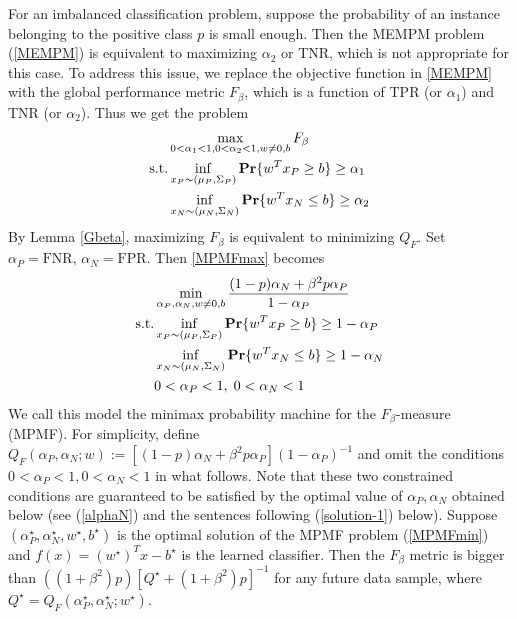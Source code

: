 \documentclass[15pt]{article}
\begin{document}
For an imbalanced classification problem, suppose the probability of an instance belonging to
the positive class $p$ is small enough. Then the MEMPM problem (\ref{MEMPM}) is equivalent to
maximizing $\alpha_2$ or TNR, which is not appropriate for this case.
To address this issue, we replace the objective function in \eqref{MEMPM} with the global performance
metric $F_\beta$, which is a function of TPR (or $\alpha_1$) and TNR (or $\alpha_2$). 
Thus we get the problem
\begin{align}\label{MPMFmax}
\begin{split}
&\max_{0<\alpha_1<1,0<\alpha_2<1, w\neq 0,b}F_\beta\\
\text{s.t.} &\inf_{x_P\sim(\mu_P,\Sigma_P)}{\rm\bf Pr}\{w^Tx_P\ge b\}\ge\alpha_1 \\
&\inf_{x_N\sim(\mu_N,\Sigma_N)}{\rm\bf Pr}\{w^T x_N\le b\}\ge\alpha_2
\end{split}
\end{align}
By Lemma \ref{Gbeta}, maximizing $F_\beta$ is equivalent to minimizing $Q_F$.
Set $\alpha_P=\mbox{FNR}$, $\alpha_N=\mbox{FPR}$. Then \eqref{MPMFmax} becomes
\begin{align}\label{MPMFmin}
\begin{split}
&\min_{\alpha_P,\alpha_N,w\neq 0, b}\frac{(1-p)\alpha_N+\beta^2p\alpha_P}{1-\alpha_P}\\
\text{s.t.} &\inf_{x_P\sim(\mu_P,\Sigma_P)}{\rm\bf Pr}\{w^T x_P\ge b\}\ge 1-\alpha_P \\
&\inf_{x_N\sim(\mu_N,\Sigma_N)}{\rm\bf Pr}\{w^T x_N\le b\}\ge 1-\alpha_N \\
&0<\alpha_P<1,\;0<\alpha_N<1
\end{split}
\end{align}
We call this model the minimax probability machine for the $F_\beta$-measure (MPMF).
For simplicity, define $Q_F(\alpha_P,\alpha_N;w):=[(1-p)\alpha_N+\beta^2p\alpha_P](1-\alpha_P)^{-1}$
and omit the conditions $0<\alpha_P<1,0<\alpha_N<1$ in what follows. 
Note that these two constrained conditions are guaranteed to be satisfied by the optimal value of 
$\alpha_P,\alpha_N$ obtained below (see (\ref{alphaN}) and the sentences following (\ref{solution-1}) below).
Suppose $(\alpha_P^\star,\alpha_N^\star,w^\star,b^\star)$ is the optimal solution of
the MPMF problem (\ref{MPMFmin}) and $f(x)=({w^\star})^Tx-b^\star$ is the learned classifier.
Then the $F_\beta$ metric is bigger than $({(1+\beta^2)p})[{Q^\star+(1+\beta^2)p}]^{-1}$ for any future data sample,
where $Q^\star=Q_F(\alpha_P^\star,\alpha_N^\star;w^\star)$.
\end{document}
